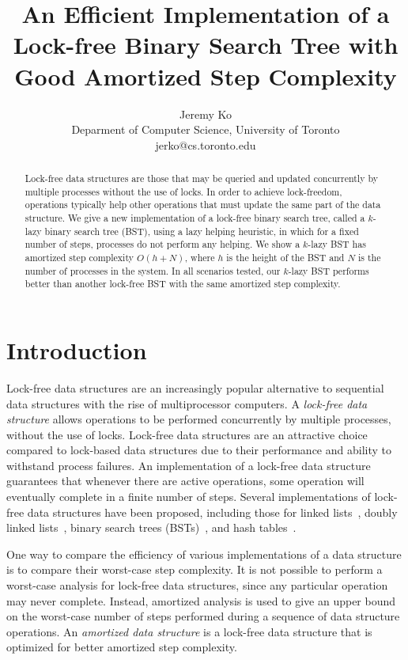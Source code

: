 \documentclass[letterpaper,twocolumn]{article}
\title{An Efficient Implementation of a Lock-free Binary Search Tree with Good Amortized Step Complexity}
\author{Jeremy Ko \\ Deparment of Computer Science, University of Toronto \\ jerko@cs.toronto.edu}
\date{}
\begin{document}
\maketitle


\begin{abstract}
Lock-free data structures are those that may be queried and updated concurrently by multiple processes without the use of locks. In order to achieve lock-freedom, operations typically help other operations that must update the same part of the data structure. We give a new implementation of a lock-free binary search tree, called a $k$-lazy binary search tree (BST), using a lazy helping heuristic, in which for a fixed number of steps, processes do not perform any helping. We show a $k$-lazy BST has amortized step complexity $O(h + N)$, where $h$ is the height of the BST and $N$ is the number of processes in the system. In all scenarios tested, our $k$-lazy BST performs better than another lock-free BST with the same amortized step complexity.
\end{abstract}


\section{Introduction}

Lock-free data structures are an increasingly popular alternative to sequential data structures with the rise of multiprocessor computers. A \textit{lock-free data structure} allows operations to be performed concurrently by multiple processes, without the use of locks. Lock-free data structures are an attractive choice compared to lock-based data structures due to their performance and ability to withstand process failures. An implementation of a lock-free data structure guarantees that whenever there are active operations, some operation will eventually complete in a finite number of steps. Several implementations of lock-free data structures have been proposed, including those for linked lists~\cite{Valois95, Harris01, FomitchevR04}, doubly linked lists~\cite{Shafiei15}, binary search trees (BSTs)~\cite{EllenFRB10, EllenFHR13, Ko18}, and hash tables~\cite{Michael02, ShalevS06, PurcellH05}.

One way to compare the efficiency of various implementations of a data structure is to compare their worst-case step complexity. It is not possible to perform a worst-case analysis for lock-free data structures, since any particular operation may never complete. Instead, amortized analysis is used to give an upper bound on the worst-case number of steps performed during a sequence of data structure operations. An \textit{amortized data structure} is a lock-free data structure that is optimized for better amortized step complexity.
\end{document}
